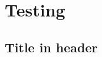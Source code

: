 \documentclass[twocolumn]{book}
\begin{document}
\chapter{Testing}
\lipsum

\section{Title in header}
\lipsum
\end{document}

